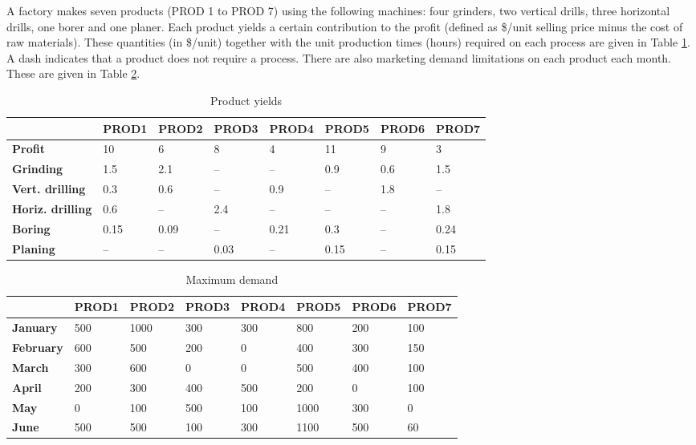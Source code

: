 A factory makes seven products (PROD 1 to PROD 7) using the
following machines: four grinders, two vertical drills, three horizontal drills, one
borer and one planer. Each product yields a certain contribution to the profit (defined
as \$/unit selling price minus the cost of raw materials). These quantities (in \$/unit)
together with the unit production times (hours) required on each process are given
in Table \ref{p1c1:tab:ex1-5_prod_yield}. A dash indicates that a product does not require a process. 
There are also marketing demand limitations on each product each month. These are given in Table \ref{p1c1:tab:ex1-5_max_demand}.

\begin{table}[h]
	\begin{tabular}{l|lllllll}
		& \textbf{PROD1} & \textbf{PROD2} & \textbf{PROD3} & \textbf{PROD4} & \textbf{PROD5} & \textbf{PROD6} & \textbf{PROD7} \\ \hline 
		\textbf{Profit} & 10    & 6     & 8     & 4     & 11    & 9     & 3     \\
		\textbf{Grinding}              & 1.5   & 2.1   & –     & –     & 0.9   & 0.6   & 1.5   \\
		\textbf{Vert. drilling}     & 0.3   & 0.6   & –     & 0.9   & –     & 1.8   & –     \\
		\textbf{Horiz. drilling}   & 0.6   & –     & 2.4   & –     & –     & –     & 1.8   \\
		\textbf{Boring}                & 0.15  & 0.09  & –     & 0.21  & 0.3   & –     & 0.24  \\
		\textbf{Planing}               & –     & –     & 0.03  & –     & 0.15  & –     & 0.15 \\ \hline
	\end{tabular}
	\caption{Product yields}
	\label{p1c1:tab:ex1-5_prod_yield}
\end{table}

\begin{table}[H]
	\begin{tabular}{l|lllllll}
		& \textbf{PROD1} & \textbf{PROD2} & \textbf{PROD3} & \textbf{PROD4} & \textbf{PROD5} & \textbf{PROD6} & \textbf{PROD7} \\ \hline
		\textbf{January}   & 500   & 1000  & 300   & 300   & 800   & 200   & 100   \\
		\textbf{February}  & 600   & 500   & 200   & 0     & 400   & 300   & 150   \\
		\textbf{March}     & 300   & 600   & 0     & 0     & 500   & 400   & 100   \\
		\textbf{April}     & 200   & 300   & 400   & 500   & 200   & 0     & 100   \\
		\textbf{May}       & 0     & 100   & 500   & 100   & 1000  & 300   & 0     \\
		\textbf{June}      & 500   & 500   & 100   & 300   & 1100  & 500   & 60    \\ \hline
	\end{tabular}
	\caption{Maximum demand}
	\label{p1c1:tab:ex1-5_max_demand}
\end{table}

